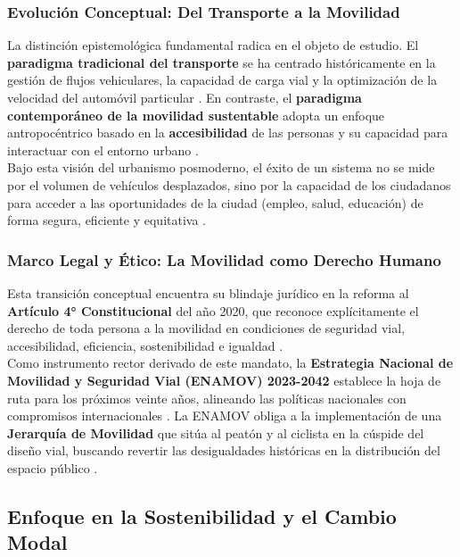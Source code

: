 \subsubsection{Evolución Conceptual: Del Transporte a la Movilidad}
\label{subsubsec:evolucion-transporte-movilidad}

La distinción epistemológica fundamental radica en el objeto de estudio. El \textbf{paradigma tradicional del transporte} 
se ha centrado históricamente en la gestión de flujos vehiculares, la capacidad de carga vial y la optimización de la 
velocidad del automóvil particular \cite{Garibaldi2024VFT, RedalycPeaton}. En contraste, el 
\textbf{paradigma contemporáneo de la movilidad sustentable} adopta un enfoque antropocéntrico basado en la 
\textbf{accesibilidad} de las personas y su capacidad para interactuar con el entorno urbano \cite{RamirezPacheco2025}. 
\\
Bajo esta visión del urbanismo posmoderno, el éxito de un sistema no se mide por el volumen de vehículos desplazados, sino 
por la capacidad de los ciudadanos para acceder a las oportunidades de la ciudad (empleo, salud, educación) de forma segura, 
eficiente y equitativa \cite{ITDP_Espacio}.

\subsubsection{Marco Legal y Ético: La Movilidad como Derecho Humano}
\label{subsubsec:marco-legal-etico}

Esta transición conceptual encuentra su blindaje jurídico en la reforma al \textbf{Artículo 4° Constitucional} del año 2020, 
que reconoce explícitamente el derecho de toda persona a la movilidad en condiciones de seguridad vial, accesibilidad, eficiencia, 
sostenibilidad e igualdad \cite{ConstitucionMex}.
\\
Como instrumento rector derivado de este mandato, la \textbf{Estrategia Nacional de Movilidad y Seguridad Vial (ENAMOV) 2023-2042} 
establece la hoja de ruta para los próximos veinte años, alineando las políticas nacionales con compromisos internacionales 
\cite{SEDATU2023}. La ENAMOV obliga a la implementación de una \textbf{Jerarquía de Movilidad} que sitúa al peatón y al ciclista 
en la cúspide del diseño vial, buscando revertir las desigualdades históricas en la distribución del espacio público \cite{SEDATU2023}.



\subsection{Enfoque en la Sostenibilidad y el Cambio Modal}
\label{subsec:sostenibilidad-cambio-modal}
 
